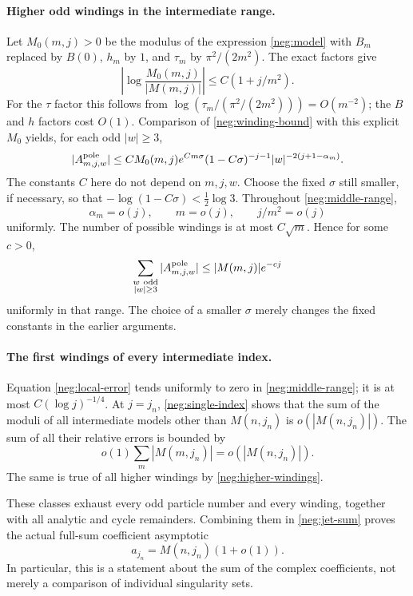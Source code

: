 \documentclass[11pt]{article}
\numberwithin{equation}{section}
\theoremstyle{definition}
\begin{document}
\paragraph{Higher odd windings in the intermediate range.}
Let \(M_0(m,j)>0\) be the modulus of the expression
\eqref{neg:model} with \(B_m\) replaced by \(B(0)\),
\(h_m\) by \(1\), and \(\tau_m\) by
\(\pi^2/(2m^2)\).  The exact factors give
\begin{equation}
 \left|\log\frac{M_0(m,j)}{|M(m,j)|}\right|
 \le C(1+j/m^2).
 \label{neg:M0}
\end{equation}
For the \(\tau\) factor this follows from
\(\log(\tau_m/(\pi^2/(2m^2)))=O(m^{-2})\);
the \(B\) and \(h\) factors cost \(O(1)\).
Comparison of \eqref{neg:winding-bound} with this
explicit \(M_0\) yields, for each odd \(|w|\ge3\),
\[
 |A^{\rm pole}_{m,j,w}|
 \le C M_0(m,j)e^{Cm\sigma}
       (1-C\sigma)^{-j-1}
       |w|^{-2(j+1-\alpha_m)} .
 \]
The constants \(C\) here do not depend on \(m,j,w\).
Choose the fixed \(\sigma\) still smaller, if necessary,
so that
\(-\log(1-C\sigma)<\tfrac12\log3\).
Throughout \eqref{neg:middle-range},
\[
 \alpha_m=o(j),\qquad m=o(j),\qquad j/m^2=o(j)
 \]
uniformly.  The number of possible windings is at most
\(C\sqrt m\).  Hence for some \(c>0\),
\begin{equation}
 \sum_{\substack{w\ {\rm odd}\\|w|\ge3}}
       |A^{\rm pole}_{m,j,w}|
 \le |M(m,j)|e^{-cj}
 \label{neg:higher-windings}
\end{equation}
uniformly in that range.  The choice of a smaller
\(\sigma\) merely changes the fixed constants in the
earlier arguments.

\paragraph{The first windings of every intermediate index.}
Equation \eqref{neg:local-error} tends uniformly to zero
in \eqref{neg:middle-range}; it is at most
\(C(\log j)^{-1/4}\).
At \(j=j_n\), \eqref{neg:single-index} shows that the sum
of the moduli of all intermediate models other than
\(M(n,j_n)\) is \(o(|M(n,j_n)|)\).
The sum of all their relative errors is bounded by
\[
 o(1)\sum_m|M(m,j_n)|=o(|M(n,j_n)|).
 \]
The same is true of all higher windings by
\eqref{neg:higher-windings}.

These classes exhaust every odd particle number and every
winding, together with all analytic and cycle remainders.
Combining them in \eqref{neg:jet-sum} proves the actual
full-sum coefficient asymptotic
\begin{equation}
 a_{j_n}=M(n,j_n)(1+o(1)).
 \label{neg:full-asymptotic}
\end{equation}
In particular, this is a statement about the sum of the
complex coefficients, not merely a comparison of individual
singularity sets.
\end{document}
